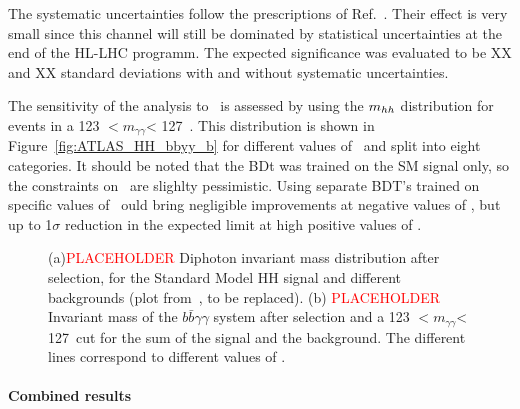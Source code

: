 The systematic uncertainties follow the prescriptions of Ref.~\cite{ATLASperformance}. Their effect is very small since this channel will still be dominated by statistical uncertainties at the end of the HL-LHC programm.
The expected significance was evaluated to be XX and XX standard deviations with and without systematic uncertainties.

The sensitivity of the analysis to \kl\ is assessed by using the $m_{hh}$ distribution for events in a 123 $ < \ensuremath{m_{\gamma\gamma}} $< 127~\UGeV. This distribution is shown in Figure~\ref{fig:ATLAS_HH_bbyy_b} for different values of \kl\ and split into eight categories. It should be noted that the BDt was trained on the SM signal only, so the constraints on \kl\ are slighlty pessimistic. Using separate BDT's trained on specific values of \kl\ ould bring negligible improvements at negative values of \kl, but up to 1$\sigma$ reduction in the expected limit at high positive values of \kl.



\begin{figure}[!htb]
\centering 
{} 
\caption{(a)\textcolor{red}{PLACEHOLDER} Diphoton invariant mass distribution after selection, for the Standard Model HH signal and different backgrounds (plot from~\cite{ITKPixelTDR}, to be replaced). (b) \textcolor{red}{PLACEHOLDER} Invariant mass of the $b\bar{b}\gamma\gamma$ system after selection and a 123 $ < \ensuremath{m_{\gamma\gamma}} $< 127~\UGeV cut for the sum of the signal and the background. The different lines correspond to different values of \kl.} 
\label{fig:ATLAS_HH_bbyy} 
\end{figure}


%
\paragraph{Combined results}


